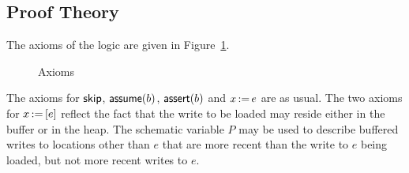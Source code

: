 \documentclass[11pt]{article}
\begin{document}
\subsection{Proof Theory}

The axioms of the logic are given in Figure~\ref{fig:axioms}.

\begin{figure}[ht]
	\centering
	\caption{\label{fig:axioms}Axioms}
\end{figure}

The axioms for $\operatorname{\mathsf{skip}}$, $\operatorname{\mathsf{assume}}(b)$, $\operatorname{\mathsf{assert}}(b)$ and $x \operatorname{:\!=} e$ are as usual. The two axioms for $x \operatorname{:\!=} \left[ e \right]$ reflect the fact that the write to be loaded may reside either in the buffer or in the heap. The schematic variable $P$ may be used to describe buffered writes to locations other than $e$ that are more recent than the write to $e$ being loaded, but not more recent writes to $e$. 
\end{document}
